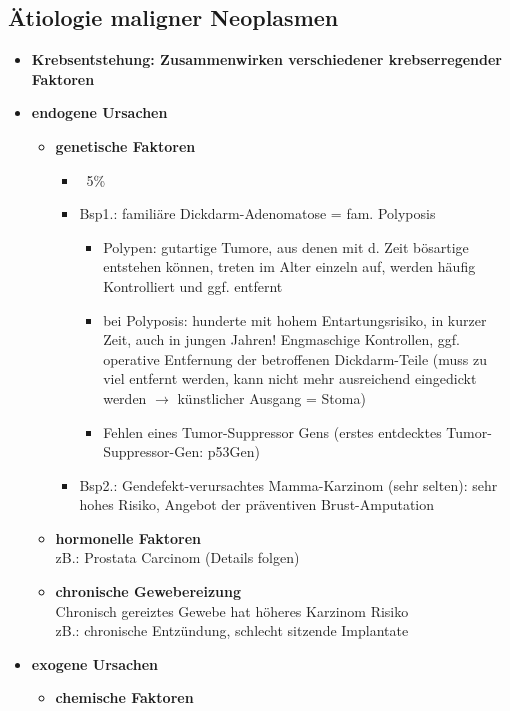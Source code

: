	\subsection{Ätiologie maligner Neoplasmen}
		\begin{itemize}
			\item \textbf{Krebsentstehung: Zusammenwirken verschiedener krebserregender Faktoren}
			\item \textbf{endogene Ursachen}
				\begin{itemize}
					\item \textbf{genetische Faktoren}
						\begin{itemize}
							\item ~5\% 
							\item Bsp1.: familiäre Dickdarm-Adenomatose = fam. Polyposis
								\begin{itemize}
									\item Polypen: gutartige Tumore, aus denen mit d. Zeit bösartige entstehen können, treten im Alter einzeln auf, werden häufig Kontrolliert und ggf. entfernt
									\item bei Polyposis: hunderte mit hohem Entartungsrisiko, in kurzer Zeit, auch in jungen Jahren! Engmaschige Kontrollen, ggf. operative Entfernung der betroffenen Dickdarm-Teile (muss zu viel entfernt werden, kann nicht mehr ausreichend eingedickt werden $\rightarrow$ künstlicher Ausgang = Stoma) 
									\item Fehlen eines Tumor-Suppressor Gens (erstes entdecktes Tumor-Suppressor-Gen: p53Gen)
								\end{itemize}
							\item Bsp2.: Gendefekt-verursachtes Mamma-Karzinom (sehr selten): sehr hohes Risiko, Angebot der präventiven Brust-Amputation
						\end{itemize}
					\item  \textbf{hormonelle Faktoren} \\
						zB.: Prostata Carcinom (Details folgen)						
					\item	\textbf{chronische Gewebereizung} \\
						Chronisch gereiztes Gewebe hat höheres Karzinom Risiko\\
						zB.: chronische Entzündung, schlecht sitzende Implantate 
				\end{itemize}
			\item \textbf{exogene Ursachen}
				\begin{itemize}
					\item \textbf{chemische Faktoren}

\end{itemize}
\end{itemize}
